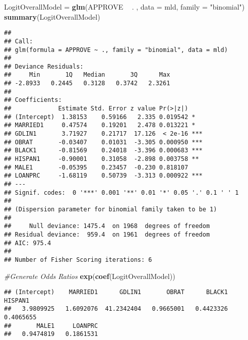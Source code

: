 \documentclass[]{article}
\newenvironment{Shaded}{\begin{snugshade}}{\end{snugshade}}
\newcommand{\CommentTok}[1]{\textcolor[rgb]{0.56,0.35,0.01}{\textit{#1}}}
\newcommand{\DataTypeTok}[1]{\textcolor[rgb]{0.13,0.29,0.53}{#1}}
\newcommand{\KeywordTok}[1]{\textcolor[rgb]{0.13,0.29,0.53}{\textbf{#1}}}
\newcommand{\NormalTok}[1]{#1}
\newcommand{\OperatorTok}[1]{\textcolor[rgb]{0.81,0.36,0.00}{\textbf{#1}}}
\newcommand{\StringTok}[1]{\textcolor[rgb]{0.31,0.60,0.02}{#1}}
\begin{document}
\begin{Shaded}
\begin{Highlighting}[]
\NormalTok{LogitOverallModel =}\StringTok{ }\KeywordTok{glm}\NormalTok{(APPROVE }\OperatorTok{~}\StringTok{ }\NormalTok{. , }\DataTypeTok{data =}\NormalTok{ mld, }
                 \DataTypeTok{family =} \StringTok{"binomial"}\NormalTok{)}
\KeywordTok{summary}\NormalTok{(LogitOverallModel)}
\end{Highlighting}
\end{Shaded}

\begin{verbatim}
## 
## Call:
## glm(formula = APPROVE ~ ., family = "binomial", data = mld)
## 
## Deviance Residuals: 
##     Min       1Q   Median       3Q      Max  
## -2.8933   0.2445   0.3128   0.3742   2.3261  
## 
## Coefficients:
##             Estimate Std. Error z value Pr(>|z|)    
## (Intercept)  1.38153    0.59166   2.335 0.019542 *  
## MARRIED1     0.47574    0.19201   2.478 0.013221 *  
## GDLIN1       3.71927    0.21717  17.126  < 2e-16 ***
## OBRAT       -0.03407    0.01031  -3.305 0.000950 ***
## BLACK1      -0.81569    0.24018  -3.396 0.000683 ***
## HISPAN1     -0.90001    0.31058  -2.898 0.003758 ** 
## MALE1       -0.05395    0.23457  -0.230 0.818107    
## LOANPRC     -1.68119    0.50739  -3.313 0.000922 ***
## ---
## Signif. codes:  0 '***' 0.001 '**' 0.01 '*' 0.05 '.' 0.1 ' ' 1
## 
## (Dispersion parameter for binomial family taken to be 1)
## 
##     Null deviance: 1475.4  on 1968  degrees of freedom
## Residual deviance:  959.4  on 1961  degrees of freedom
## AIC: 975.4
## 
## Number of Fisher Scoring iterations: 6
\end{verbatim}

\begin{Shaded}
\begin{Highlighting}[]
\CommentTok{#Generate Odds Ratios}
\KeywordTok{exp}\NormalTok{(}\KeywordTok{coef}\NormalTok{(LogitOverallModel))}
\end{Highlighting}
\end{Shaded}

\begin{verbatim}
## (Intercept)    MARRIED1      GDLIN1       OBRAT      BLACK1     HISPAN1 
##   3.9809925   1.6092076  41.2342404   0.9665001   0.4423326   0.4065655 
##       MALE1     LOANPRC 
##   0.9474819   0.1861531
\end{verbatim}
\end{document}
